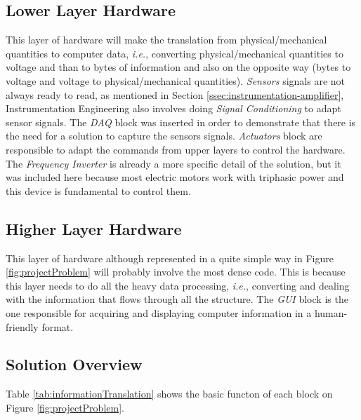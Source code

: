 	\subsection{Lower Layer Hardware}\label{ssec:lowerLayerlHardware}

		This layer of hardware will make the translation from physical/mechanical quantities to computer data, \textit{i.e.}, converting physical/mechanical quantities to voltage and than to bytes of information and also on the opposite way (bytes to voltage and voltage to physical/mechanical quantities). \textit{Sensors} signals are not always ready to read, as mentioned in Section \ref{ssec:instrumentation-amplifier}, Instrumentation Engineering also involves doing \textit{Signal Conditioning} to adapt sensor signals. The \textit{DAQ} block was inserted in order to demonstrate that there is the need for a solution to capture the sensors signals. \textit{Actuators} block are responsible to adapt the commands from upper layers to control the hardware. The \textit{Frequency Inverter} is already a more specific detail of the solution, but it was included here because most electric motors work with triphasic power and this device is fundamental to control them.

	\subsection{Higher Layer Hardware}\label{ssec:higherLayerlHardware}
	
		This layer of hardware although represented in a quite simple way in Figure \ref{fig:projectProblem} will probably involve the most dense code. This is because this layer needs to do all the heavy data processing, \textit{i.e.}, converting and dealing with the information that flows through all the structure. The \textit{GUI} block is the one responsible for acquiring and displaying computer information in a human-friendly format.

	\subsection{Solution Overview}\label{ssec:solutionOverview}

	Table \ref{tab:informationTranslation} shows the basic functon of each block on Figure \ref{fig:projectProblem}.

